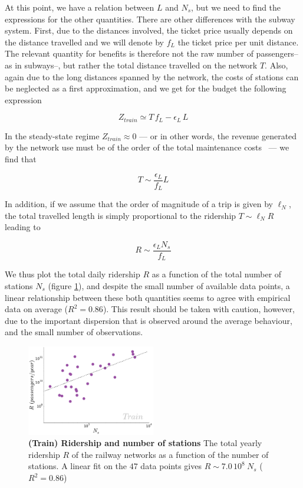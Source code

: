 At this point, we have a relation between $L$ and $N_s$, but we need to find the
expressions for the other quantities. There are other differences with the
subway system. First, due to the distances involved, the ticket price usually
depends on the distance travelled and we will denote by $f_L$ the ticket price
per unit distance. The relevant quantity for benefits is therefore not the raw
number of passengers--as in subways--, but rather the total distance travelled
on the network $T$. Also, again due to the long distances spanned by the
network, the costs of stations can be neglected as a first approximation, and we
get for the budget the following expression

\begin{equation}
    Z_{train} \simeq T\, f_L - \epsilon_L\, L
\end{equation}

In the steady-state regime $Z_{train}\approx 0$ --- or in other words, the
revenue generated by the network use must be of the order of the total
maintenance costs~\cite{Louf:2013} --- we find that

\begin{equation}
    T \sim \frac{\epsilon_L}{f_L} L
\end{equation}

In addition, if we assume that the order of magnitude of a trip is given by
$\ell_N$, the total travelled length is simply proportional to the ridership
$T\sim \ell_N R$ leading to 

\begin{equation}
    R \sim \frac{\epsilon_LN_s}{f_L}
\end{equation}

We thus plot the total daily ridership $R$ as a function of the total number of
stations $N_s$ (figure \ref{fig:train_rider}), and despite the small number of
available data points, a linear relationship between these both quantities seems
to agree with empirical data on average ($R^2 = 0.86$). This result should be
taken with caution, however, due to the important dispersion that is observed
around the average behaviour, and the small number of observations.

\begin{figure}
    \centering
    \includegraphics[width=0.5\textwidth]{gfx/chapter-networks/rail_ridership_stations.pdf}
    \caption{{\bf(Train) Ridership and number of stations} The total yearly ridership $R$ of the railway networks as a function of the number of stations. A linear fit on the $47$ data points gives $R \sim 7.0\,10^8\:N_s$ ($R^2 = 0.86$)}
\label{fig:train_rider}
\end{figure}

